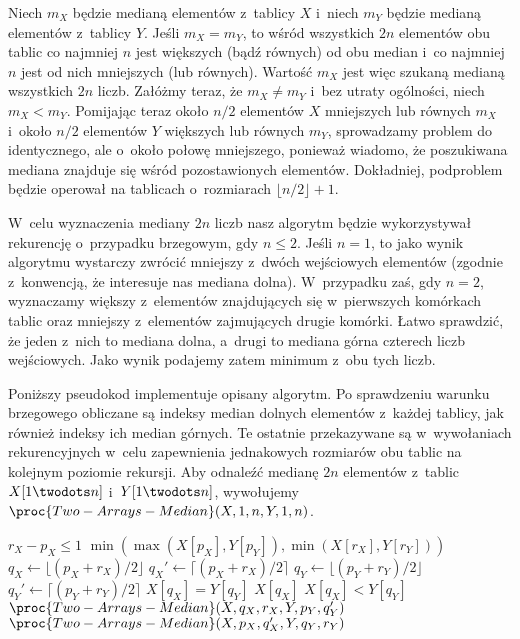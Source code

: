 \exercise %
Niech $m_X$ będzie medianą elementów z~tablicy $X$ i~niech $m_Y$ będzie medianą elementów z~tablicy $Y$.
Jeśli $m_X=m_Y$, to wśród wszystkich $2n$ elementów obu tablic co najmniej $n$ jest większych (bądź równych) od obu median i~co najmniej $n$ jest od nich mniejszych (lub równych).
Wartość $m_X$ jest więc szukaną medianą wszystkich $2n$ liczb.
Załóżmy teraz, że $m_X\ne m_Y$ i~bez utraty ogólności, niech $m_X<m_Y$.
Pomijając teraz około $n/2$ elementów $X$ mniejszych lub równych $m_X$ i~około $n/2$ elementów $Y$ większych lub równych $m_Y$, sprowadzamy problem do identycznego, ale o~około połowę mniejszego, ponieważ wiadomo, że poszukiwana mediana znajduje się wśród pozostawionych elementów.
Dokładniej, podproblem będzie operował na tablicach o~rozmiarach $\lfloor n/2\rfloor+1$.

W~celu wyznaczenia mediany $2n$ liczb nasz algorytm będzie wykorzystywał rekurencję o~przypadku brzegowym, gdy $n\le2$.
Jeśli $n=1$, to jako wynik algorytmu wystarczy zwrócić mniejszy z~dwóch wejściowych elementów (zgodnie z~konwencją, że interesuje nas mediana dolna).
W~przypadku zaś, gdy $n=2$, wyznaczamy większy z~elementów znajdujących się w~pierwszych komórkach tablic oraz mniejszy z~elementów zajmujących drugie komórki.
Łatwo sprawdzić, że jeden z~nich to mediana dolna, a~drugi to mediana górna czterech liczb wejściowych.
Jako wynik podajemy zatem minimum z~obu tych liczb.

Poniższy pseudokod implementuje opisany algorytm.
Po sprawdzeniu warunku brzegowego obliczane są indeksy median dolnych elementów z~każdej tablicy, jak również indeksy ich median górnych.
Te ostatnie przekazywane są w~wywołaniach rekurencyjnych w~celu zapewnienia jednakowych rozmiarów obu tablic na kolejnym poziomie rekursji.
Aby odnaleźć medianę $2n$ elementów z~tablic $X[1\twodots n]$ i~$Y[1\twodots n]$, wywołujemy $\proc{Two-Arrays-Median}(X,1,n,Y,1,n)$.

\begin{codebox}
\li	\If $r_X-p_X\le1$
\li		\Then \Return $\min(\max(X[p_X],Y[p_Y]),\min(X[r_X],Y[r_Y]))$
		\End
\li	$q_X\gets\lfloor(p_X+r_X)/2\rfloor$
\li	$q_X'\gets\lceil(p_X+r_X)/2\rceil$
\li	$q_Y\gets\lfloor(p_Y+r_Y)/2\rfloor$
\li	$q_Y'\gets\lceil(p_Y+r_Y)/2\rceil$
\li	\If $X[q_X]=Y[q_Y]$
\li		\Then \Return $X[q_X]$
		\End
\li	\If $X[q_X]<Y[q_Y]$
\li		\Then \Return $\proc{Two-Arrays-Median}(X,q_X,r_X,Y,p_Y,q_Y')$
\li		\Else \Return $\proc{Two-Arrays-Median}(X,p_X,q_X',Y,q_Y,r_Y)$
		\End
\end{codebox}

